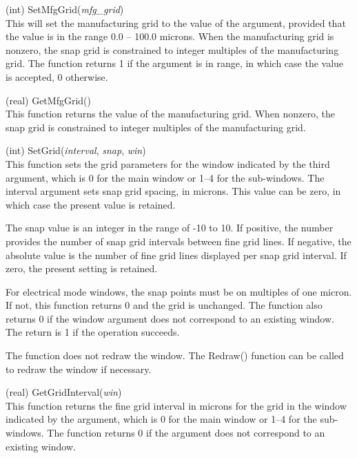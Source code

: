 \begin{description}
\item{(int) \vt SetMfgGrid({\it mfg\_grid\/})}\\
This will set the manufacturing grid to the value of the argument,
provided that the value is in the range 0.0 -- 100.0 microns.  When
the manufacturing grid is nonzero, the snap grid is constrained to
integer multiples of the manufacturing grid.  The function returns 1
if the argument is in range, in which case the value is accepted, 0
otherwise.

\item{(real) \vt GetMfgGrid()}\\
This function returns the value of the manufacturing grid.  When
nonzero, the snap grid is constrained to integer multiples of the
manufacturing grid.

\item{(int) \vt SetGrid({\it interval\/}, {\it snap},  {\it win\/})}\\
This function sets the grid parameters for the window indicated by the
third argument, which is 0 for the main window or 1--4 for the
sub-windows.  The interval argument sets snap grid spacing, in
microns.  This value can be zero, in which case the present value is
retained.

The snap value is an integer in the range of -10 to 10.  If positive,
the number provides the number of snap grid intervals between fine
grid lines.  If negative, the absolute value is the number of fine
grid lines displayed per snap grid interval.  If zero, the present
setting is retained.
 
For electrical mode windows, the snap points must be on multiples of
one micron.  If not, this function returns 0 and the grid is
unchanged.  The function also returns 0 if the window argument does
not correspond to an existing window.  The return is 1 if the
operation succeeds.

The function does not redraw the window.  The {\vt Redraw()} function
can be called to redraw the window if necessary.

\item{(real) \vt GetGridInterval({\it win\/})}\\
This function returns the fine grid interval in microns for the grid
in the window indicated by the argument, which is 0 for the main
window or 1--4 for the sub-windows.  The function returns 0 if the
argument does not correspond to an existing window.


\end{description}
